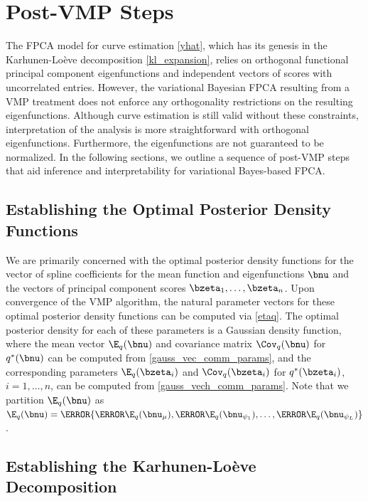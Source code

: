 \documentclass[ba]{imsart}
\numberwithin{equation}{section}
\theoremstyle{plain}
\def\numu{\bnu_\mu}
\newcommand\nupsi[1]{\bnu_{\psi_{#1}}}
\begin{document}
\section{Post-VMP Steps}
\label{sec:post_vmp_steps}

The FPCA model for curve estimation \eqref{yhat}, which has its genesis in the Karhunen-Lo\`{e}ve decomposition
\eqref{kl_expansion}, relies on orthogonal functional principal component
eigenfunctions and independent vectors of scores with uncorrelated entries.
However, the variational Bayesian FPCA resulting from a VMP treatment
does not enforce any orthogonality restrictions on the resulting eigenfunctions. Although curve estimation is still
valid without these constraints, interpretation of the analysis is more straightforward with orthogonal
eigenfunctions. Furthermore, the eigenfunctions are not guaranteed to be normalized.
In the following sections, we outline
a sequence of post-VMP steps that aid inference and interpretability for variational Bayes-based FPCA.


\subsection{Establishing the Optimal Posterior Density Functions}
\label{sec:opt_dens_funcs}

We are primarily concerned with the optimal posterior density functions for the vector of spline coefficients for
the mean function and eigenfunctions $\bnu$ and the vectors of principal component scores $\bzeta_1, \dots,
\bzeta_n$. Upon convergence of the VMP algorithm, the natural parameter vectors for these optimal posterior density
functions can be computed via \eqref{etaq}.
The optimal posterior density for each of these parameters is a Gaussian density
function, where the mean vector $\E_q (\bnu)$ and covariance matrix $\Cov_q (\bnu)$ for $q^* (\bnu)$
can be computed from
\eqref{gauss_vec_comm_params}, and the corresponding parameters $\E_q (\bzeta_i)$ and $\Cov_q (\bzeta_i)$
for $q^* (\bzeta_i)$, $i = 1, \dots, n$, can be
computed from \eqref{gauss_vech_comm_params}. Note that we partition $\E_q (\bnu)$ as $\E_q (\bnu) =
\T{\{ \T{\E_q (\numu)}, \T{\E_q (\nupsi{1})}, \dots, \T{\E_q (\nupsi{L})} \}}$.


\subsection{Establishing the Karhunen-Lo\`{e}ve Decomposition}
\label{sec:biorthogonal}
\end{document}
